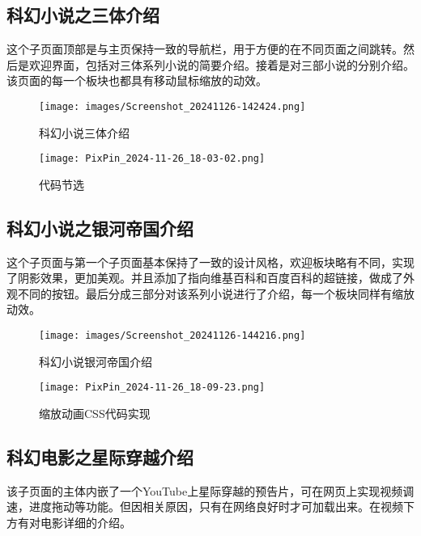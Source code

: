 \documentclass[supercite]{Experimental_Report}
\theoremstyle{definition}
\begin{document}
\subsection{科幻小说之三体介绍}

这个子页面顶部是与主页保持一致的导航栏，用于方便的在不同页面之间跳转。然后是欢迎界面，包括对三体系列小说的简要介绍。接着是对三部小说的分别介绍。该页面的每一个板块也都具有移动鼠标缩放的动效。

\begin{figure}[htb]
    \centering
    \texttt{[image: images/Screenshot\_20241126-142424.png]}
    \caption{科幻小说三体介绍}
    \label{fig:enter-label}
\end{figure}

\begin{figure}[htb]
    \centering
    \texttt{[image: PixPin\_2024-11-26\_18-03-02.png]}
    \caption{代码节选}
    \label{fig:enter-label}
\end{figure}

\newpage

\subsection{科幻小说之银河帝国介绍}

这个子页面与第一个子页面基本保持了一致的设计风格，欢迎板块略有不同，实现了阴影效果，更加美观。并且添加了指向维基百科和百度百科的超链接，做成了外观不同的按钮。最后分成三部分对该系列小说进行了介绍，每一个板块同样有缩放动效。

\begin{figure}[htb]
    \centering
    \texttt{[image: images/Screenshot\_20241126-144216.png]}
    \caption{科幻小说银河帝国介绍}
    \label{fig:enter-label}
\end{figure}

\begin{figure}[htb]
    \centering
    \texttt{[image: PixPin\_2024-11-26\_18-09-23.png]}
    \caption{缩放动画CSS代码实现}
    \label{fig:enter-label}
\end{figure}

\newpage

\subsection{科幻电影之星际穿越介绍}

该子页面的主体内嵌了一个YouTube上星际穿越的预告片，可在网页上实现视频调速，进度拖动等功能。但因相关原因，只有在网络良好时才可加载出来。在视频下方有对电影详细的介绍。
\end{document}
